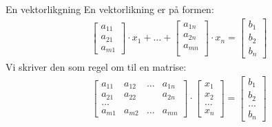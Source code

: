 \documentclass[11pt, a4paper, norsk]{article}
\begin{document}
        \begin{Definition}{En vektorlikgning}{}
            En vektorlikning er på formen:
            \begin{align*}
                \begin{bmatrix}
                    a_{11} \\
                    a_{21} \\
                    a_{m1}
                \end{bmatrix} \cdot x_1 + \dots + \begin{bmatrix}
                    a_{1n} \\
                    a_{2n} \\
                    a_{mn} \\
                    \end{bmatrix} \cdot x_{n} = \begin{bmatrix}
                        b_1 \\
                        b_2 \\
                        b_{n}
                    \end{bmatrix}
            \end{align*}
            Vi skriver den som regel om til en matrise:
            \begin{align*}
                \begin{bmatrix}
                    a_{11} & a_{12} & \dots & a_{1n} \\
                    a_{21} & a_{22} & & a_{2n} \\
                    \dots & & & \\
                    a_{m1} & a_{m2} & \dots & a_{mn}
                \end{bmatrix} \cdot \begin{bmatrix}
                    x_1 \\
                    x_2 \\
                    \dots \\
                    x_{n}
                \end{bmatrix} = \begin{bmatrix}
                    b_1 \\
                    b_2 \\
                    \dots \\
                    b_{n}
                \end{bmatrix}
            \end{align*}
            
        \end{Definition}
        
\end{document}
